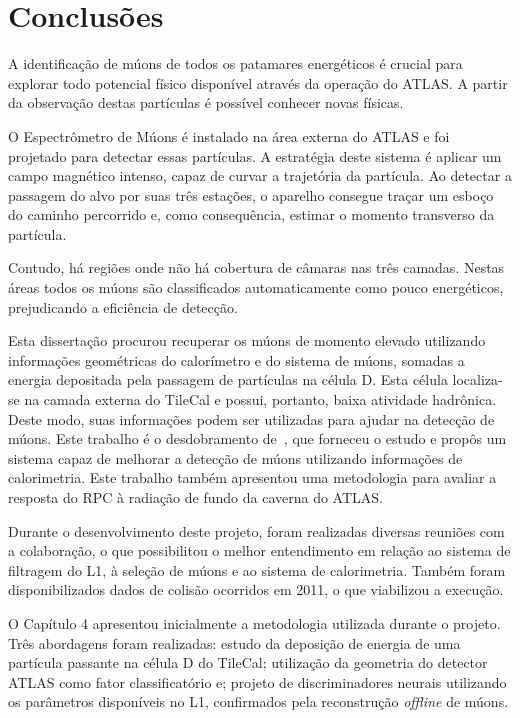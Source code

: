 \chapter{Conclusões}

A identificação de múons de todos os patamares energéticos é crucial para
explorar todo potencial físico disponível através da operação do ATLAS. A partir
da observação destas partículas é possível conhecer novas físicas.

O Espectrômetro de Múons é instalado na área externa do ATLAS e foi projetado
para detectar essas partículas. A estratégia deste sistema é aplicar um
campo magnético intenso, capaz de curvar a trajetória da partícula. Ao detectar
a passagem do alvo por suas três estações, o aparelho consegue traçar
um esboço do caminho percorrido e, como consequência, estimar o momento
transverso da partícula.

Contudo, há regiões onde não há cobertura de câmaras nas três camadas. Nestas
áreas todos os múons são classificados automaticamente como pouco energéticos,
prejudicando a eficiência de detecção.

Esta dissertação procurou recuperar os múons de momento elevado utilizando
informações geométricas do calorímetro e do sistema de múons, somadas a energia
depositada pela passagem de partículas na célula D. Esta célula localiza-se na
camada externa do TileCal e possui, portanto, baixa atividade hadrônica. Deste
modo, suas informações podem ser utilizadas para ajudar na detecção de múons.
Este trabalho é o desdobramento de~\cite{CIODARO2012}, que forneceu o estudo e
propôs um sistema capaz de melhorar a detecção de múons utilizando informações
de calorimetria. Este trabalho também apresentou uma metodologia para avaliar a
resposta do RPC à radiação de fundo da caverna do ATLAS.

Durante o desenvolvimento deste projeto, foram realizadas diversas reuniões com
a colaboração, o que possibilitou o melhor entendimento em relação ao sistema de
filtragem do L1, à seleção de múons e ao sistema de calorimetria. Também foram
disponibilizados dados de colisão ocorridos em 2011, o que viabilizou a
execução.

O Capítulo 4 apresentou inicialmente a metodologia utilizada durante o projeto.
Três abordagens foram realizadas:  estudo da deposição de energia de uma
partícula passante na célula D do TileCal; utilização da geometria do detector
ATLAS como fator classificatório e; projeto de discriminadores neurais
utilizando os parâmetros disponíveis no L1, confirmados pela reconstrução
\emph{offline} de múons.

